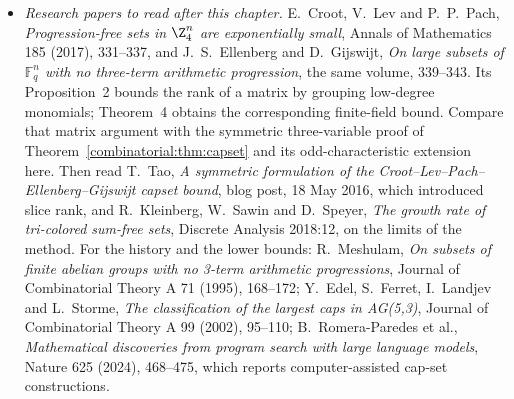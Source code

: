 \begin{itemize}
{theory}, Bulletin of the Research Council of Israel 10F (1961), 41--43; Z.~Dvir, \emph{On the size of Kakeya sets in finite fields}, Journal of the AMS 22 (2009), 1093--1097.
\item \emph{Research papers to read after this chapter.} E.~Croot, V.~Lev and P.~P.~Pach, \emph{Progression-free sets in $\Z_4^n$ are exponentially small}, Annals of Mathematics 185 (2017), 331--337, and J.~S.~Ellenberg
and D.~Gijswijt, \emph{On large subsets of $\mathbb F_q^n$ with no three-term arithmetic progression}, the same volume, 339--343. Its Proposition~2 bounds the rank of a matrix by grouping low-degree monomials; Theorem~4 obtains the corresponding finite-field bound.
Compare that matrix argument with the symmetric three-variable proof of
Theorem~\ref{combinatorial:thm:capset} and its odd-characteristic extension here. Then read
T.~Tao, \emph{A symmetric formulation of the Croot--Lev--Pach--Ellenberg--Gijswijt capset bound}, blog post, 18 May 2016, which introduced slice rank, and R.~Kleinberg, W.~Sawin and D.~Speyer, \emph{The growth rate of
tri-colored sum-free sets}, Discrete Analysis 2018:12, on the limits of the method. For the history and the lower bounds: R.~Meshulam, \emph{On subsets of finite abelian groups with no 3-term arithmetic
progressions}, Journal of Combinatorial Theory A 71 (1995), 168--172; Y.~Edel, S.~Ferret, I.~Landjev and L.~Storme, \emph{The classification of the largest caps in AG(5,3)}, Journal of Combinatorial Theory A 99
(2002), 95--110; B.~Romera-Paredes et al., \emph{Mathematical discoveries from program search with large language models}, Nature 625 (2024), 468--475, which reports computer-assisted cap-set constructions.
\end{itemize}
